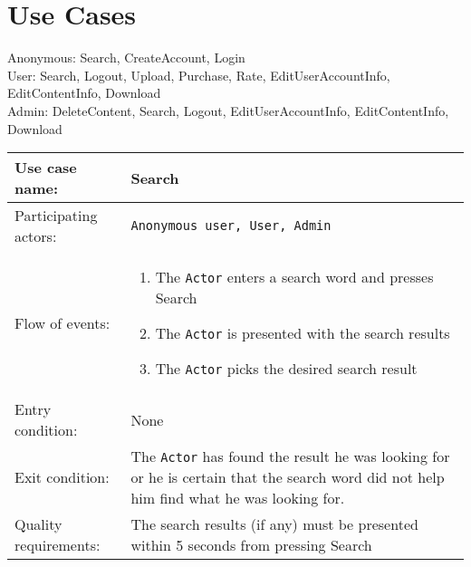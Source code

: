 \documentclass[../report.tex]{subfiles}
\begin{document}
\section{Use Cases}
Anonymous: Search, CreateAccount, Login \\
User: Search, Logout, Upload, Purchase, Rate, EditUserAccountInfo, EditContentInfo, Download \\
Admin: DeleteContent, Search, Logout, EditUserAccountInfo, EditContentInfo, Download \\

\noindent
\begin{tabular}{| l | p{8cm} |}
  \hline                        
 Use case name:  & Search   \\   \hline                
 Participating actors:  & \texttt{Anonymous user, User, Admin} \\   \hline %
  Flow of events: & \begin{enumerate}
\item{The \texttt{Actor} enters a search word and presses Search}
\item{The \texttt{Actor} is presented with the search results}
\item{The \texttt{Actor} picks the desired search result}
\end{enumerate}
 \\   \hline 
Entry condition: & None \\ \hline
Exit condition: & The \texttt{Actor} has found the result he was looking for or he is certain that the search word did not help him find what he was looking for. \\ \hline
Quality requirements: & The search results (if any) must be presented within 5 seconds from pressing Search \\ \hline             
\end{tabular}
\end{document}
